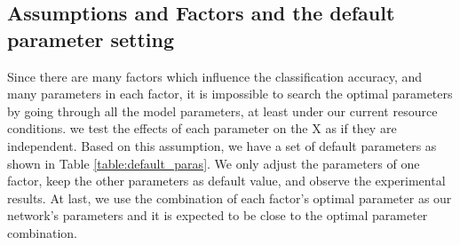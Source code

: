 \subsection{Assumptions and Factors and the default parameter setting}
Since there are many factors which influence the classification accuracy, and many parameters in each factor, it is impossible to search the optimal parameters by going through all the model parameters, at least under our current resource conditions. we test the effects of each parameter on the X as if they are independent. Based on this assumption, we have a set of default parameters as shown in Table \ref{table:default_paras}. We only adjust the parameters of one factor, keep the other parameters as default value, and observe the experimental results. At last, we use the combination of each factor's optimal parameter as our network's parameters and it is expected to be close to the optimal parameter combination.
  \renewcommand\arraystretch{1.2}  
